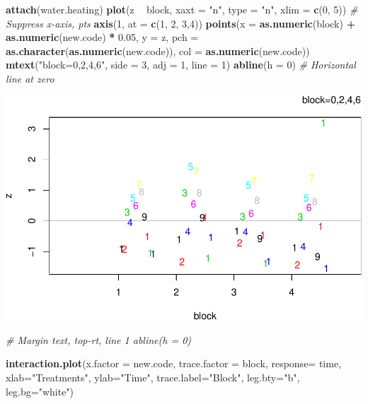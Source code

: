 \documentclass[12pt,]{article}
\newenvironment{Shaded}{\begin{snugshade}}{\end{snugshade}}
\newcommand{\KeywordTok}[1]{\textcolor[rgb]{0.13,0.29,0.53}{\textbf{#1}}}
\newcommand{\DataTypeTok}[1]{\textcolor[rgb]{0.13,0.29,0.53}{#1}}
\newcommand{\DecValTok}[1]{\textcolor[rgb]{0.00,0.00,0.81}{#1}}
\newcommand{\FloatTok}[1]{\textcolor[rgb]{0.00,0.00,0.81}{#1}}
\newcommand{\StringTok}[1]{\textcolor[rgb]{0.31,0.60,0.02}{#1}}
\newcommand{\CommentTok}[1]{\textcolor[rgb]{0.56,0.35,0.01}{\textit{#1}}}
\newcommand{\OperatorTok}[1]{\textcolor[rgb]{0.81,0.36,0.00}{\textbf{#1}}}
\newcommand{\NormalTok}[1]{#1}
\begin{document}
\begin{Shaded}
\begin{Highlighting}[]
\KeywordTok{attach}\NormalTok{(water.heating)}
\KeywordTok{plot}\NormalTok{(z }\OperatorTok{~}\StringTok{ }\NormalTok{block, }\DataTypeTok{xaxt =} \StringTok{"n"}\NormalTok{, }\DataTypeTok{type =} \StringTok{"n"}\NormalTok{, }\DataTypeTok{xlim =} \KeywordTok{c}\NormalTok{(}\DecValTok{0}\NormalTok{, }\DecValTok{5}\NormalTok{)) }\CommentTok{# Suppress x-axis, pts}
\KeywordTok{axis}\NormalTok{(}\DecValTok{1}\NormalTok{, }\DataTypeTok{at =} \KeywordTok{c}\NormalTok{(}\DecValTok{1}\NormalTok{, }\DecValTok{2}\NormalTok{, }\DecValTok{3}\NormalTok{,}\DecValTok{4}\NormalTok{))}
\KeywordTok{points}\NormalTok{(}\DataTypeTok{x =} \KeywordTok{as.numeric}\NormalTok{(block) }\OperatorTok{+}\StringTok{ }\KeywordTok{as.numeric}\NormalTok{(new.code) }\OperatorTok{*}\StringTok{ }\FloatTok{0.05}\NormalTok{, }\DataTypeTok{y =}\NormalTok{ z,}
\DataTypeTok{pch =} \KeywordTok{as.character}\NormalTok{(}\KeywordTok{as.numeric}\NormalTok{(new.code)), }\DataTypeTok{col =} \KeywordTok{as.numeric}\NormalTok{(new.code)) }
\KeywordTok{mtext}\NormalTok{(}\StringTok{"block=0,2,4,6"}\NormalTok{, }\DataTypeTok{side =} \DecValTok{3}\NormalTok{, }\DataTypeTok{adj =} \DecValTok{1}\NormalTok{, }\DataTypeTok{line =} \DecValTok{1}\NormalTok{)}
\KeywordTok{abline}\NormalTok{(}\DataTypeTok{h =} \DecValTok{0}\NormalTok{) }\CommentTok{# Horizontal line at zero}
\end{Highlighting}
\end{Shaded}

\includegraphics{Markdown_HW_8_files/figure-latex/unnamed-chunk-4-1.pdf}

\begin{Shaded}
\begin{Highlighting}[]
 \CommentTok{# Margin text, top-rt, line 1 abline(h = 0)}

\KeywordTok{interaction.plot}\NormalTok{(}\DataTypeTok{x.factor =}\NormalTok{ new.code, }\DataTypeTok{trace.factor =}\NormalTok{ block, }
                 \DataTypeTok{response=}\NormalTok{ time, }\DataTypeTok{xlab=}\StringTok{"Treatments"}\NormalTok{, }\DataTypeTok{ylab=}\StringTok{"Time"}\NormalTok{, }
                 \DataTypeTok{trace.label=}\StringTok{"Block"}\NormalTok{, }\DataTypeTok{leg.bty=}\StringTok{"b"}\NormalTok{, }\DataTypeTok{leg.bg=}\StringTok{"white"}\NormalTok{)}
\end{Highlighting}
\end{Shaded}
\end{document}
